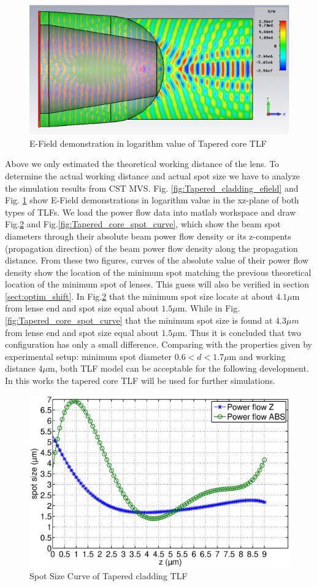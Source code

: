 \begin{figure}[!ht]
	\centering
		\includegraphics[width=0.8 \textwidth]{bilder/cst_lensed_fiber_efield}
		\caption{E-Field demonstration in logarithm value of Tapered core TLF}
 		\label{fig:Tapered_core_efield}	
\end{figure}
Above we only estimated the theoretical working distance of the lens. To determine the actual working distance and actual spot size we have to analyze the simulation results from CST MVS. Fig. \ref{fig:Tapered_cladding_efield} and  Fig. \ref{fig:Tapered_core_efield} show  E-Field demonstrations  in logarithm value in the xz-plane of both types of TLFs. We load the power flow data into matlab workspace and draw Fig.\ref{fig:Tapered_cladding_spot_curve} and Fig.\ref{fig:Tapered_core_spot_curve}, which show the beam spot diameters through their absolute beam power flow density or its z-compents (propagation direction) of the beam power flow density along the propagation distance. From these two figures, curves of the absolute value of their power flow density show the location of the minimum spot matching the previous theoretical location of the minimum spot of lenses. This guess will also be verified in section \ref{sect:optim_shift}. In Fig.\ref{fig:Tapered_cladding_spot_curve} that the minimum spot size locate at about $4.1 \mu$m from lense end and spot size equal about $1.5 \mu$m. While in Fig.\ref{fig:Tapered_core_spot_curve} that the minimum spot size is found at  $4.3 \mu m$ from lense end and spot size equal about $1.5 \mu$m. Thus it is concluded that two configuration has only a small difference. Comparing with the properties given by experimental setup: minimum spot diameter $0.6<d<1.7 \mu$m and working distance $4\mu$m, both TLF model can be acceptable for the following development. In this works the tapered core TLF will be used for further simulations.\\
\begin{figure}[!ht]
		\centering
		\includegraphics[width=0.7 \textwidth]{bilder/Tapered_cladding_spot_curve}
		\caption{Spot Size Curve of Tapered cladding TLF}
		\label{fig:Tapered_cladding_spot_curve}
\end{figure} 
